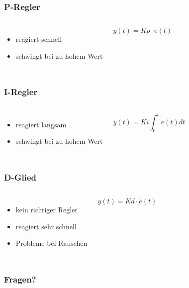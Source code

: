 \documentclass[12pt,a4paper, ngerman]{beamer}
\begin{document}
\begin{frame}
\frametitle{P-Regler}
\begin{columns}
\begin{itemize}
\item reagiert schnell
\item schwingt bei zu hohem Wert
\end{itemize}
\begin{equation*}
y(t)=Kp\cdot e(t)
\end{equation*}
\end{columns}
\end{frame}

\begin{frame}
\frametitle{I-Regler}
\begin{columns}
\begin{itemize}
\item reagiert langsam
\item schwingt bei zu hohem Wert
\end{itemize}
\begin{equation*}
y(t)=Ki\int_{0}^{t}e(t)dt
\end{equation*}
\end{columns}
\end{frame}

\begin{frame}
\frametitle{D-Glied}
\begin{columns}
\begin{itemize}
\item kein richtiger Regler
\item reagiert sehr schnell
\item Probleme bei Rauschen
\end{itemize}
\begin{equation*}
y(t)=Kd\cdot \dot{e}(t)
\end{equation*}
\end{columns}
\end{frame}


\begin{frame}
\frametitle{Fragen?}
\begin{center}
\color{blue}
\end{center}
\end{frame}
\end{document}

